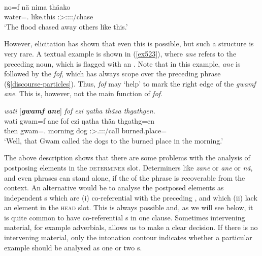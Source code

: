 \begin{exe}
	\\
	\gll no=f nä nima thäako\\
	water=\Erg.\Sg{} \Indf{} {like.this} \Stsg:\Sbj>\Stpl:\Obj:\Pst:\Pfv:\Andat/chase\\
	\trans `The flood chased away others like this.'
	\label{ex522}
\end{exe}

However, elicitation has shown that even this is possible, but such a structure is very rare. A textual example is shown in (\ref{ex523}), where \emph{ane} refers to the preceding noun, which is flagged with an . Note that in this example, \emph{ane} is followed by the   \emph{fof}, which has always scope over the preceding phrase (\S{}\ref{discourse-particles}). Thus, \emph{fof} may `help' to mark the right edge of the  \emph{gwamf ane}. This is, however, not the main function of \emph{fof}.

\begin{exe}
	\ex \emph{wati} [\emph{\textbf{gwamf ane}}] \emph{fof ezi ŋatha thäsa thgathgen.}\\
	\gll wati gwam=f ane fof ezi ŋatha thäa thgathg=en\\
	then gwam=\Erg.\Sg{} \Dem{} \Emph{} morning dog \Stsg:\Sbj>\Tsg.\Masc:\Obj:\Pst:\Pfv/call {burned.place=\Loc}\\
	\trans `Well, that Gwam called the dogs to the burned place in the morning.'\\
	\label{ex523}
\end{exe}

The above description shows that there are some problems with the analysis of postposing elements in the \textsc{determiner} slot. Determiners like \emph{zane} or \emph{ane} or \emph{nä}, and even  phrases can stand alone, if the  of the phrase is recoverable from the context. An alternative would be to analyse the postposed elements as independent s which are (i) co-referential with the preceding , and which (ii) lack an element in the \textsc{head} slot. This is always possible and, as we will see below, it is quite common to have co-referential s in one clause. Sometimes intervening material, for example adverbials, allows us to make a clear decision. If there is no intervening material, only the intonation contour indicates whether a particular example should be analysed as one or two s.%

